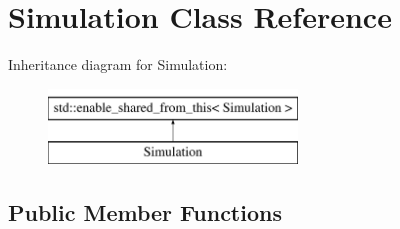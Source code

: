 \hypertarget{classSimulation}{}\section{Simulation Class Reference}
\label{classSimulation}
Inheritance diagram for Simulation\+:\begin{figure}[H]
\begin{center}
\leavevmode
\includegraphics[height=2.000000cm]{classSimulation}
\end{center}
\end{figure}
\subsection*{Public Member Functions}
